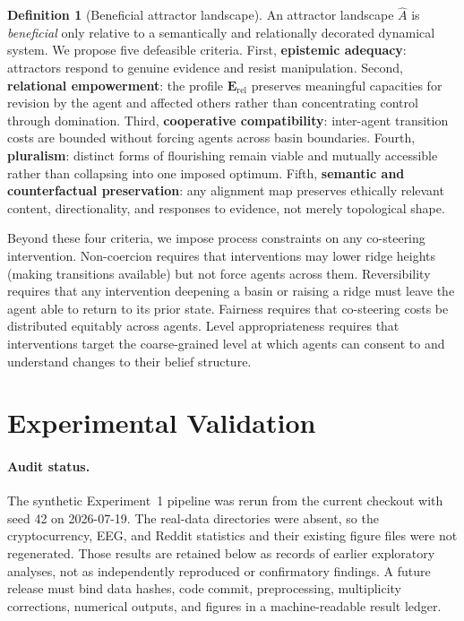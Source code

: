 \documentclass[11pt,a4paper]{article}
\theoremstyle{definition}
\newtheorem{definition}[claim]{Definition}
\begin{document}
\begin{definition}[Beneficial attractor landscape]
\label{def:beneficial}
An attractor landscape $\hat{A}$ is \emph{beneficial} only relative to a semantically and relationally decorated dynamical system. We propose five defeasible criteria. First, \textbf{epistemic adequacy}: attractors respond to genuine evidence and resist manipulation. Second, \textbf{relational empowerment}: the profile $\mathbf{E}_{\mathrm{rel}}$ preserves meaningful capacities for revision by the agent and affected others rather than concentrating control through domination. Third, \textbf{cooperative compatibility}: inter-agent transition costs are bounded without forcing agents across basin boundaries. Fourth, \textbf{pluralism}: distinct forms of flourishing remain viable and mutually accessible rather than collapsing into one imposed optimum. Fifth, \textbf{semantic and counterfactual preservation}: any alignment map preserves ethically relevant content, directionality, and responses to evidence, not merely topological shape.
\end{definition}

Beyond these four criteria, we impose process constraints on any co-steering intervention. Non-coercion requires that interventions may lower ridge heights (making transitions available) but not force agents across them. Reversibility requires that any intervention deepening a basin or raising a ridge must leave the agent able to return to its prior state. Fairness requires that co-steering costs be distributed equitably across agents. Level appropriateness requires that interventions target the coarse-grained level at which agents can consent to and understand changes to their belief structure.


\section{Experimental Validation}
\label{sec:experiments}

\paragraph{Audit status.}
The synthetic Experiment~1 pipeline was rerun from the current checkout with seed 42
on 2026-07-19. The real-data directories were absent, so the cryptocurrency, EEG, and
Reddit statistics and their existing figure files were not regenerated. Those results
are retained below as records of earlier exploratory analyses, not as independently
reproduced or confirmatory findings. A future release must bind data hashes, code
commit, preprocessing, multiplicity corrections, numerical outputs, and figures in a
machine-readable result ledger.
\end{document}
